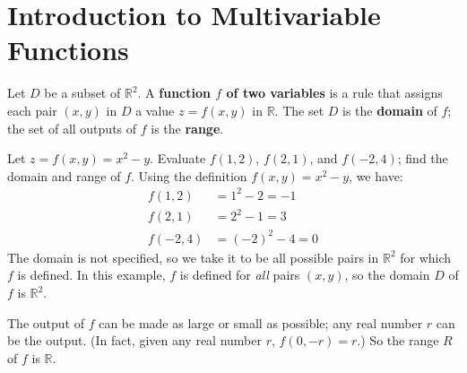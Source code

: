 \section{Introduction to Multivariable Functions}\label{sec:multi_intro}

\begin{definition}\label{def:multi2}
Let $D$ be a subset of $\mathbb{R}^2$. A \textbf{function $f$ of two variables} is a rule that assigns each pair $(x,y)$ in $D$ a value $z=f(x,y)$ in $\mathbb{R}$. The set $D$ is the \textbf{domain} of $f$; the set of all outputs of $f$ is the \textbf{range}.
\end{definition}


\begin{example}\label{ex_multi1}
Let $z=f(x,y) = x^2-y$. Evaluate $f(1,2)$, $f(2,1)$, and $f(-2,4)$; find the domain and range of $f$.
\solution
Using the definition $f(x,y) = x^2-y$, we have:
\begin{align*}
f(1,2) &= 1^2-2 = -1\\
f(2,1) &=	2^2-1 = 3\\
f(-2,4) &= (-2)^2-4 = 0
\end{align*}
The domain is not specified, so we take it to be all possible pairs in $\mathbb{R}^2$ for which $f$ is defined. In this example, $f$ is defined for \emph{all} pairs $(x,y)$, so the domain $D$ of $f$ is $\mathbb{R}^2$. 

The output of $f$ can be made as large or small as possible; any real number $r$ can be the output. (In fact, given any real number $r$, $f(0,-r)=r$.) So the range $R$ of $f$ is $\mathbb{R}$.
\end{example}


